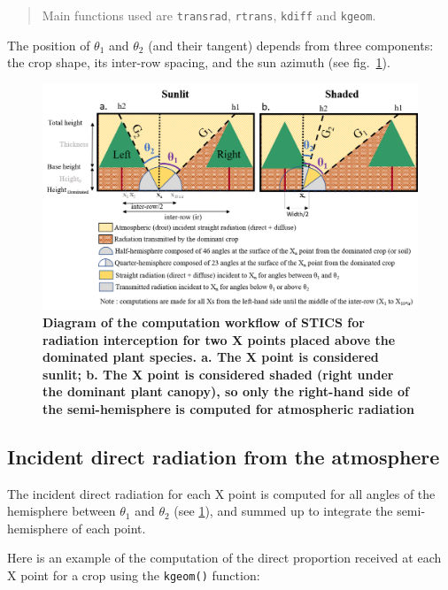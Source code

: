 \documentclass[
]{book}
\begin{document}
\begin{quote}
Main functions used are \texttt{transrad}, \texttt{rtrans}, \texttt{kdiff} and \texttt{kgeom}.
\end{quote}

The position of \(\theta_1\) and \(\theta_2\) (and their tangent) depends from three components: the crop shape, its inter-row spacing, and the sun azimuth (see fig.~\ref{fig:Compdominated}).

\begin{figure}
\centering
\includegraphics{img/Light-interception-dominated.png}
\caption{\label{fig:Compdominated}\textbf{Diagram of the computation workflow of STICS for radiation interception for two X points placed above the dominated plant species. a. The X point is considered sunlit; b. The X point is considered shaded (right under the dominant plant canopy), so only the right-hand side of the semi-hemisphere is computed for atmospheric radiation}}
\end{figure}

\hypertarget{incident-direct-radiation-from-the-atmosphere}{%
\subsection{Incident direct radiation from the atmosphere}\label{incident-direct-radiation-from-the-atmosphere}}

The incident direct radiation for each X point is computed for all angles of the hemisphere between \(\theta_1\) and \(\theta_2\) (see \ref{fig:Compdominated}), and summed up to integrate the semi-hemisphere of each point.

Here is an example of the computation of the direct proportion received at each X point for a crop using the \texttt{kgeom()} function:
\end{document}
